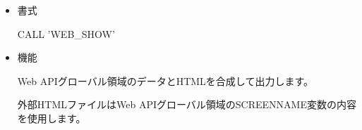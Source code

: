 
\begin{itemize}
\item{書式}

CALL 'WEB\_SHOW'

\item{機能}

Web APIグローバル領域のデータとHTMLを合成して出力します。

\vspace{1em}

外部HTMLファイルはWeb APIグローバル領域のSCREENNAME変数の内容を使用します。

\end{itemize}